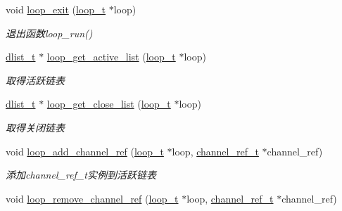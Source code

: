 \begin{DoxyCompactItemize}
void \hyperlink{a00104_ga898c7e8ef4ff2f360a32454b2b1013de_ga898c7e8ef4ff2f360a32454b2b1013de}{loop\+\_\+exit} (\hyperlink{a00050_a9c3ad1cd2de83e09f3a7b59fa82c94ee_a9c3ad1cd2de83e09f3a7b59fa82c94ee}{loop\+\_\+t} $\ast$loop)
\begin{DoxyCompactList}\small\item\em 退出函数loop\+\_\+run() \end{DoxyCompactList}\item 
\hyperlink{a00050_ad6644d67df4b4e3596c1eb12977d1d16_ad6644d67df4b4e3596c1eb12977d1d16}{dlist\+\_\+t} $\ast$ \hyperlink{a00068_a7c1a2360919bfff72d665f2651a8d080_a7c1a2360919bfff72d665f2651a8d080}{loop\+\_\+get\+\_\+active\+\_\+list} (\hyperlink{a00050_a9c3ad1cd2de83e09f3a7b59fa82c94ee_a9c3ad1cd2de83e09f3a7b59fa82c94ee}{loop\+\_\+t} $\ast$loop)
\begin{DoxyCompactList}\small\item\em 取得活跃链表 \end{DoxyCompactList}\item 
\hyperlink{a00050_ad6644d67df4b4e3596c1eb12977d1d16_ad6644d67df4b4e3596c1eb12977d1d16}{dlist\+\_\+t} $\ast$ \hyperlink{a00068_a282fa587372c0abd536f46a396cd41d4_a282fa587372c0abd536f46a396cd41d4}{loop\+\_\+get\+\_\+close\+\_\+list} (\hyperlink{a00050_a9c3ad1cd2de83e09f3a7b59fa82c94ee_a9c3ad1cd2de83e09f3a7b59fa82c94ee}{loop\+\_\+t} $\ast$loop)
\begin{DoxyCompactList}\small\item\em 取得关闭链表 \end{DoxyCompactList}\item 
void \hyperlink{a00068_ab4f4cfdde0b598a3e8267a5ff60775ec_ab4f4cfdde0b598a3e8267a5ff60775ec}{loop\+\_\+add\+\_\+channel\+\_\+ref} (\hyperlink{a00050_a9c3ad1cd2de83e09f3a7b59fa82c94ee_a9c3ad1cd2de83e09f3a7b59fa82c94ee}{loop\+\_\+t} $\ast$loop, \hyperlink{a00050_a151271c9d188ef28d4d24bb81dcc1263_a151271c9d188ef28d4d24bb81dcc1263}{channel\+\_\+ref\+\_\+t} $\ast$channel\+\_\+ref)
\begin{DoxyCompactList}\small\item\em 添加channel\+\_\+ref\+\_\+t实例到活跃链表 \end{DoxyCompactList}\item 
void \hyperlink{a00068_a074c9c3a80a8a5c57b831e41395d4ef5_a074c9c3a80a8a5c57b831e41395d4ef5}{loop\+\_\+remove\+\_\+channel\+\_\+ref} (\hyperlink{a00050_a9c3ad1cd2de83e09f3a7b59fa82c94ee_a9c3ad1cd2de83e09f3a7b59fa82c94ee}{loop\+\_\+t} $\ast$loop, \hyperlink{a00050_a151271c9d188ef28d4d24bb81dcc1263_a151271c9d188ef28d4d24bb81dcc1263}{channel\+\_\+ref\+\_\+t} $\ast$channel\+\_\+ref)

\end{DoxyCompactItemize}

